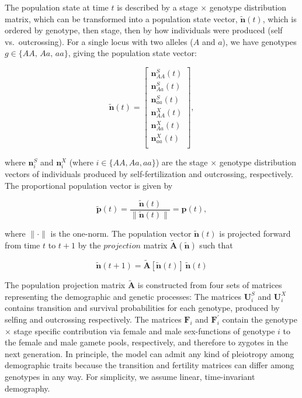 \documentclass[11pt]{article}
\def\mbf#1{\mathbf{#1}}
\begin{document}
The population state at time $t$ is described by a stage $\times$ genotype distribution matrix, which can be transformed into a population state vector, $\tilde{\mbf{n}}(t)$, which is ordered by genotype, then stage, then by how individuals were produced (self vs.~outcrossing). For a single locus with two alleles ($A$ and $a$), we have genotypes $g \in \{AA,\, Aa,\, aa\}$, giving the population state vector:
\begin{linenomath*}
\begin{equation}
	\tilde{\mbf{n}}(t) =  \left[
								\begin{array}{c}
									\mbf{n}^{S}_{AA}(t) \\
									\mbf{n}^{S}_{Aa}(t) \\
									\mbf{n}^{S}_{aa}(t) \\ \hline
									\mbf{n}^{X}_{AA}(t) \\
									\mbf{n}^{X}_{Aa}(t) \\
									\mbf{n}^{X}_{aa}(t) \\ 
						\end{array} \right],
\end{equation}
\end{linenomath*}

\noindent where $\mbf{n}^{S}_{i}$ and $\mbf{n}^{X}_{i}$ (where $i \in \{AA,Aa,aa\}$) are the stage $\times$ genotype distribution vectors of individuals produced by self-fertilization and outcrossing, respectively. The proportional population vector is given by
\begin{linenomath*}
\begin{equation} \label{eq:propPopVec}
	\tilde{\mbf{p}}(t) = \frac{\tilde{\mbf{n}}(t)}{ \| \tilde{\mbf{n}}(t) \|} = \mbf{p}(t),
\end{equation}
\end{linenomath*}

\noindent where $\| \cdot \|$ is the one-norm. The population vector $\tilde{\mbf{n}}(t)$ is projected forward from time $t$ to $t + 1$ by the $projection$ matrix $\tilde{\mbf{A}}(\tilde{\mbf{n}})$ such that 
\begin{linenomath*}
\begin{equation}
	\tilde{\mbf{n}}(t + 1) = \tilde{\mbf{A}}[\tilde{\mbf{n}}(t)] \, \tilde{\mbf{n}}(t)
\end{equation}
\end{linenomath*}

The population projection matrix $\tilde{\mbf{A}}$ is constructed from four sets of matrices representing the demographic and genetic processes: The matrices $\mbf{U}^{S}_{i}$ and $\mbf{U}^{X}_{i}$ contains transition and survival probabilities for each genotype, produced by selfing and outcrossing respectively. The matrices $\mbf{F}_{i}$ and $\mbf{F}^{\prime}_{i}$ contain the genotype $\times$ stage specific contribution via female and male sex-functions of genotype $i$ to the female and male gamete pools, respectively, and therefore to zygotes in the next generation. In principle, the model can admit any kind of pleiotropy among demographic traits because the transition and fertility matrices can differ among genotypes in any way. For simplicity, we assume linear, time-invariant demography.
\end{document}
